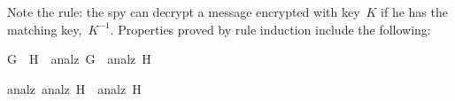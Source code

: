 \begin{isabellebody}
%
\endisatagproof
{\isafoldproof}%
%
\isadelimproof
%
\endisadelimproof
%
\isadelimproof
%
\endisadelimproof
%
\isatagproof
%
\endisatagproof
{\isafoldproof}%
%
\isadelimproof
%
\endisadelimproof
%
\isadelimproof
%
\endisadelimproof
%
\isatagproof
%
\endisatagproof
{\isafoldproof}%
%
\isadelimproof
%
\endisadelimproof
%
\isadelimproof
%
\endisadelimproof
%
\isatagproof
%
\endisatagproof
{\isafoldproof}%
%
\isadelimproof
%
\endisadelimproof
%
\isadelimproof
%
\endisadelimproof
%
\isatagproof
%
\endisatagproof
{\isafoldproof}%
%
\isadelimproof
%
\endisadelimproof
%
\isadelimproof
%
\endisadelimproof
%
\isatagproof
%
\endisatagproof
{\isafoldproof}%
%
\isadelimproof
%
\endisadelimproof
%
\isadelimproof
%
\endisadelimproof
%
\isatagproof
%
\endisatagproof
{\isafoldproof}%
%
\isadelimproof
%
\endisadelimproof
%
\isadelimproof
%
\endisadelimproof
%
\isatagproof
%
\endisatagproof
{\isafoldproof}%
%
\isadelimproof
%
\endisadelimproof
%
\isadelimproof
%
\endisadelimproof
%
\isatagproof
%
\endisatagproof
{\isafoldproof}%
%
\isadelimproof
%
\endisadelimproof
%
\isadelimproof
%
\endisadelimproof
%
\isatagproof
%
\endisatagproof
{\isafoldproof}%
%
\isadelimproof
%
\endisadelimproof
%
\isadelimproof
%
\endisadelimproof
%
\isatagproof
%
\endisatagproof
{\isafoldproof}%
%
\isadelimproof
%
\endisadelimproof
%
\isadelimproof
%
\endisadelimproof
%
\isatagproof
%
\endisatagproof
{\isafoldproof}%
%
\isadelimproof
%
\endisadelimproof
%
\isadelimproof
%
\endisadelimproof
%
\isatagproof
%
\endisatagproof
{\isafoldproof}%
%
\isadelimproof
%
\endisadelimproof
%
\begin{isamarkuptext}%
Note the  rule: the spy can decrypt a
message encrypted with key~$K$ if he has the matching key,~$K^{-1}$. 
Properties proved by rule induction include the following:
\begin{isabelle}%
G\ {}\ H\ {}\ analz\ G\ {}\ analz\ H\par\smallskip%
analz\ {}analz\ H{}\ {}\ analz\ H%
\end{isabelle}


\end{isamarkuptext}
\end{isabellebody}
